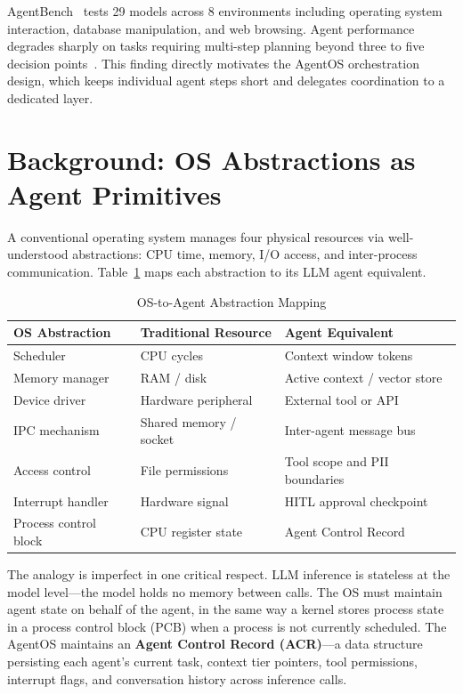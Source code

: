 \documentclass[journal]{IEEEtran}
\begin{document}
AgentBench~\cite{liu2024agentbench} tests 29 models across 8 environments including operating system interaction, database manipulation, and web browsing. Agent performance degrades sharply on tasks requiring multi-step planning beyond three to five decision points~\cite{liu2024agentbench}. This finding directly motivates the AgentOS orchestration design, which keeps individual agent steps short and delegates coordination to a dedicated layer.

\section{Background: OS Abstractions as Agent Primitives}
\label{sec:background}

A conventional operating system manages four physical resources via well-understood abstractions: CPU time, memory, I/O access, and inter-process communication. Table~\ref{tab:mapping} maps each abstraction to its LLM agent equivalent.

\begin{table}[h]
\caption{OS-to-Agent Abstraction Mapping}
\label{tab:mapping}
\centering
\begin{tabular}{p{2.5cm}p{2.5cm}p{3cm}}
\toprule
\textbf{OS Abstraction} & \textbf{Traditional Resource} & \textbf{Agent Equivalent} \\
\midrule
Scheduler & CPU cycles & Context window tokens \\
Memory manager & RAM / disk & Active context / vector store \\
Device driver & Hardware peripheral & External tool or API \\
IPC mechanism & Shared memory / socket & Inter-agent message bus \\
Access control & File permissions & Tool scope and PII boundaries \\
Interrupt handler & Hardware signal & HITL approval checkpoint \\
Process control block & CPU register state & Agent Control Record \\
\bottomrule
\end{tabular}
\end{table}

The analogy is imperfect in one critical respect. LLM inference is stateless at the model level---the model holds no memory between calls. The OS must maintain agent state on behalf of the agent, in the same way a kernel stores process state in a process control block (PCB) when a process is not currently scheduled. The AgentOS maintains an \textbf{Agent Control Record (ACR)}---a data structure persisting each agent's current task, context tier pointers, tool permissions, interrupt flags, and conversation history across inference calls.
\end{document}

